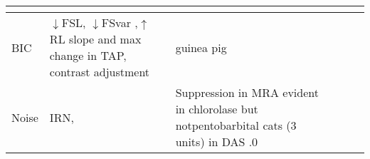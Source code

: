 \begin{longtable}{XXXXXX}
             \citep{DavisYoung:2000,SpirouDavisEtAl:1999}               &                                                                          & \\\hline
                                  BIC                                   & $\downarrow
$FSL, $\downarrow $FSvar ,$\uparrow $RL slope and
max\citep{PalombiCaspary:1992} change in TAP, contrast adjustment
                       \citep{EbertOstwald:1995}                        & guinea pig
              \citep{EvansZhao:1998,PalombiCaspary:1992}                & 
             \citep{DavisYoung:2000,SpirouDavisEtAl:1999}               &                                                                          & \\\hline
                                 Noise                                  & 
                  IRN,\citep{PalmerWallaceEtAl:2003}                    & \citep{ArnottWallaceEtAl:2004}
Suppression in MRA evident in chlorolase but notpentobarbital cats (3 units)
    \citep{Rhode:1994,RhodeSmith:1986} in DAS \citep{Joris:1998}.0      & 


\end{longtable}
